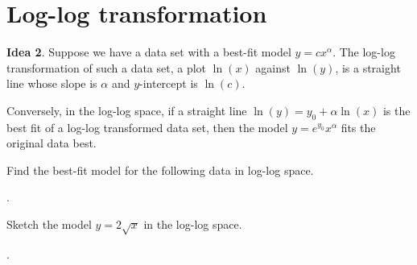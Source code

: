 \documentclass[../main.tex]{subfiles}
\begin{document}
 \section{Log-log transformation}

\begin{mdframed}[style=simple]
  \textbf{Idea 2}. Suppose we have a data set with a best-fit model \(y = c x^{\alpha}\). 
  The log-log transformation of such a data set, a plot \(\ln(x)\) against \(\ln(y)\), is a straight line whose slope is \(\alpha\) and \(y\)-intercept is \(\ln(c)\).

  Conversely, in the log-log space, if a straight line \(\ln(y) = y_{0} + \alpha \ln(x)\) is the best fit of a log-log transformed data set, then the model \(y = e^{y_{0}} x^{\alpha}\) fits the original data best.
\end{mdframed}

\begin{example}
  Find the best-fit model for the following data in log-log space.

  .
\end{example}

\begin{example}
  Sketch the model \(y = 2 \sqrt{x}\) in the log-log space.

  .
\end{example}
\end{document}
